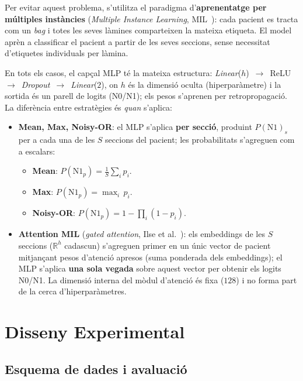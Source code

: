 \documentclass[10pt,a4paper,twocolumn,twoside]{article}
\begin{document}
Per evitar aquest problema, s'utilitza el paradigma d'\textbf{aprenentatge per múltiples instàncies}
(\textit{Multiple Instance Learning}, MIL~\cite{dietterich1997mil}): cada pacient es tracta com un \textit{bag} i totes les seves
làmines comparteixen la mateixa etiqueta. El model aprèn a classificar el pacient a partir de les
seves seccions, sense necessitat d'etiquetes individuals per làmina.

En tots els casos, el capçal MLP té la mateixa estructura:
\textit{Linear}($h$)~$\to$~ReLU~$\to$~\textit{Dropout}~$\to$~\textit{Linear}($2$), on
$h$ és la dimensió oculta (hiperparàmetre) i la sortida és un parell de logits (N0/N1);
els pesos s'aprenen per retropropagació. La diferència entre estratègies és \emph{quan} s'aplica:

\begin{itemize}
    \item \textbf{Mean, Max, Noisy-OR}: el MLP s'aplica \textbf{per secció}, produint
    $P(\text{N1})_s$ per a cada una de les $S$ seccions del pacient; les probabilitats
    s'agreguen com a escalars:
    \begin{itemize}\itemsep0pt
        \item \textbf{Mean}: $P(\text{N1}_{p}) = \frac{1}{S}\sum_i p_i$.
        \item \textbf{Max}: $P(\text{N1}_{p}) = \max_i\,p_i$.
        \item \textbf{Noisy-OR}: $P(\text{N1}_{p}) = 1 - \prod_{i}(1 - p_i)$.
    \end{itemize}
    \item \textbf{Attention MIL} (\textit{gated attention},
    Ilse et al.~\cite{ilse2018attentionbaseddeepmultipleinstance}): els embeddings de les
    $S$ seccions ($\mathbb{R}^{h}$ cadascun) s'agreguen primer en un únic vector de pacient
    mitjançant pesos d'atenció apresos (suma ponderada dels embeddings); el MLP s'aplica
    \textbf{una sola vegada} sobre aquest vector per obtenir els logits N0/N1. La dimensió
    interna del mòdul d'atenció és fixa ($128$) i no forma part de la cerca d'hiperparàmetres.
\end{itemize}

\section{Disseny Experimental}

\subsection{Esquema de dades i avaluació}
\label{sec:training-scheme}
\end{document}
